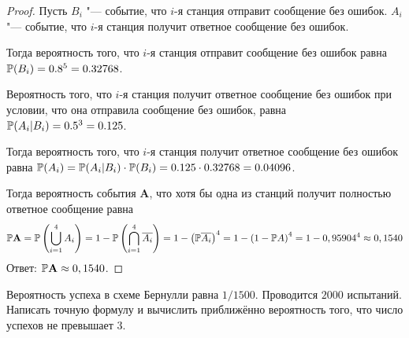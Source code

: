 \begin{proof}
	Пусть \(B_i\) "--- событие, что \(i\)-я станция отправит сообщение без ошибок. \(A_i\) "--- событие, что \(i\)-я станция получит ответное сообщение без ошибок.

	Тогда вероятность того, что \(i\)-я станция отправит сообщение без ошибок равна \(\mathbb P(B_i) = 0.8^5 = 0.32768\).

	Вероятность того, что \(i\)-я станция получит ответное сообщение без ошибок при условии, что она отправила сообщение без ошибок, равна \(\mathbb P(A_i | B_i) = 0.5^3 = 0.125\).

	Тогда вероятность того, что \(i\)-я станция получит ответное сообщение без ошибок равна \(\mathbb P(A_i) = \mathbb P(A_i | B_i) \cdot \mathbb P(B_i) = 0.125 \cdot 0.32768 = 0.04096\).

	Тогда вероятность события \(\mathbf{A} \), что хотя бы одна из станций получит полностью ответное сообщение равна
	\[
		\begin{aligned}
			\mathbb P \mathbf{A} &
			= \mathbb P\left(\bigcup_{i=1}^4 A_i\right) = 1 - \mathbb P\left(\bigcap_{i=1}^4 \overline{A_i}\right)
			= 1 - \left(\mathbb P \overline{A_i}\right) ^ 4 = 1 - \left(1-\mathbb P A\right)^4 = 1 - 0,95904^4 \approx 0,1540 \\
		\end{aligned}
	\]
	Ответ: \(\mathbb P \mathbf{A} \approx 0,1540\).
\end{proof}

\begin{problem}
Вероятность успеха в схеме Бернулли равна \(1/1500\). Проводится \(2000\) испытаний. Написать точную формулу и вычислить приближённо вероятность того, что число успехов не превышает \(3\).
\end{problem}

